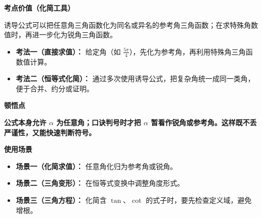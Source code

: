 \begin{explanationbox}
\medskip
\textbf{\textcolor{CExplanation}{考点价值（化简工具）}}

诱导公式可以把任意角三角函数化为同名或异名的参考角三角函数；在求特殊角数值时，再进一步化为锐角三角函数。
\begin{itemize}[leftmargin=*, itemsep=0.5em, topsep=0.4em]
    \item \textbf{考法一（直接求值）：} 给定角（如 $\frac{5\pi}{4}$），先化为参考角，再利用特殊角三角函数值计算。
    \item \textbf{考法二（恒等式化简）：} 通过多次使用诱导公式，把复杂角统一成同一类角，便于合并、约分或证明。
\end{itemize}

\medskip
\textbf{\textcolor{CExplanation}{顿悟点}}

\textbf{公式本身允许 $\alpha$ 为任意角；口诀判号时才把 $\alpha$ 暂看作锐角或参考角。这样既不丢严谨性，又能快速判断符号。}

\medskip
\textbf{\textcolor{CExplanation}{使用场景}}
\begin{itemize}[leftmargin=*, itemsep=0.5em, topsep=0.4em]
    \item \textbf{场景一（化简求值）：} 任意角化归为参考角或锐角。
    \item \textbf{场景二（三角变形）：} 在恒等式变换中调整角度形式。
    \item \textbf{场景三（三角方程）：} 化简含 $\tan$、$\cot$ 的式子时，要先检查定义域，避免增根。
\end{itemize}
\end{explanationbox}
